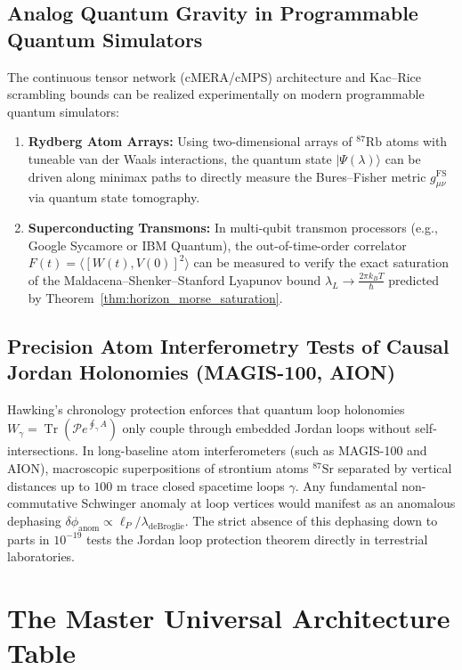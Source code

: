 \documentclass[11pt,a4paper,reqno]{amsart}
\theoremstyle{definition}
\numberwithin{equation}{section}
\newcommand{\Tr}{\operatorname{Tr}}
\begin{document}
\subsection{Analog Quantum Gravity in Programmable Quantum Simulators}
The continuous tensor network (cMERA/cMPS) architecture and Kac--Rice scrambling bounds can be realized experimentally on modern programmable quantum simulators:
\begin{enumerate}[label=(\alph*)]
    \item \textbf{Rydberg Atom Arrays:} Using two-dimensional arrays of $^{87}\mathrm{Rb}$ atoms with tuneable van der Waals interactions, the quantum state $|\Psi(\lambda)\rangle$ can be driven along minimax paths to directly measure the Bures--Fisher metric $g^{\mathrm{FS}}_{\mu\nu}$ via quantum state tomography.
    \item \textbf{Superconducting Transmons:} In multi-qubit transmon processors (e.g., Google Sycamore or IBM Quantum), the out-of-time-order correlator $F(t) = \langle [W(t), V(0)]^2 \rangle$ can be measured to verify the exact saturation of the Maldacena--Shenker--Stanford Lyapunov bound $\lambda_L \to \frac{2\pi k_B T}{\hbar}$ predicted by Theorem~\ref{thm:horizon_morse_saturation}.
\end{enumerate}

\subsection{Precision Atom Interferometry Tests of Causal Jordan Holonomies (MAGIS-100, AION)}
Hawking's chronology protection enforces that quantum loop holonomies $W_\gamma = \Tr(\mathcal{P} e^{\oint_\gamma A})$ only couple through embedded Jordan loops without self-intersections. In long-baseline atom interferometers (such as MAGIS-100 and AION), macroscopic superpositions of strontium atoms $^{87}\mathrm{Sr}$ separated by vertical distances up to $100\text{ m}$ trace closed spacetime loops $\gamma$. Any fundamental non-commutative Schwinger anomaly at loop vertices would manifest as an anomalous dephasing $\delta \phi_{\mathrm{anom}} \propto \ell_P / \lambda_{\mathrm{deBroglie}}$. The strict absence of this dephasing down to parts in $10^{-19}$ tests the Jordan loop protection theorem directly in terrestrial laboratories.

\section{The Master Universal Architecture Table}
\label{sec:master_table}
\end{document}
